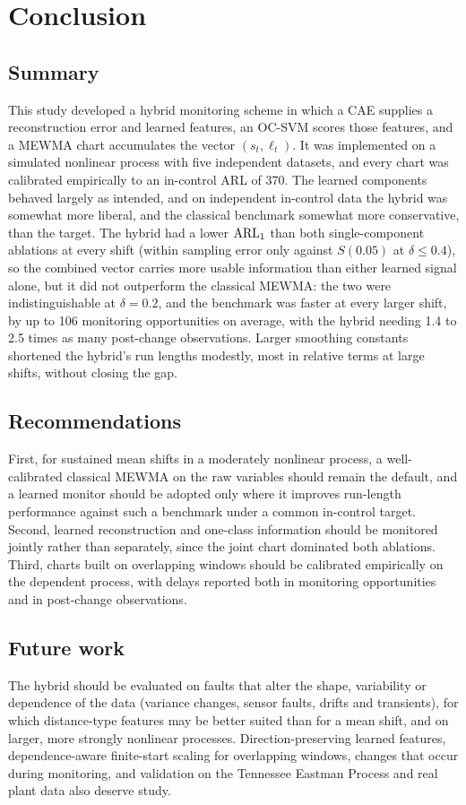 \section{Conclusion}

\subsection{Summary}

This study developed a hybrid monitoring scheme in which a CAE supplies a reconstruction error and
learned features, an OC-SVM scores those features, and a MEWMA chart accumulates the vector
$(s_t,\ell_t)$. It was implemented on a simulated nonlinear process with five independent datasets,
and every chart was calibrated empirically to an in-control ARL of 370. The learned components
behaved largely as intended, and on independent in-control data the hybrid was somewhat more liberal,
and the classical benchmark somewhat more conservative, than the target. The hybrid had a lower
$\mathrm{ARL}_1$ than both single-component ablations at every shift (within sampling error only against
$S(0.05)$ at $\delta\le0.4$), so the combined vector carries more usable information than either
learned signal alone, but it did not outperform the classical MEWMA: the two were
indistinguishable at $\delta=0.2$, and the benchmark was faster at every larger shift, by up to 106
monitoring opportunities on average, with the hybrid needing 1.4 to 2.5 times as many post-change
observations. Larger smoothing constants shortened the hybrid's run lengths modestly, most in
relative terms at large shifts, without closing the gap.

\subsection{Recommendations}

First, for sustained mean shifts in a moderately nonlinear process, a well-calibrated classical MEWMA
on the raw variables should remain the default, and a learned monitor should be adopted only where it
improves run-length performance against such a benchmark under a common in-control target. Second,
learned reconstruction and one-class information should be monitored jointly rather than separately,
since the joint chart dominated both ablations. Third, charts built on overlapping windows should be
calibrated empirically on the dependent process, with delays reported both in monitoring
opportunities and in post-change observations.

\subsection{Future work}

The hybrid should be evaluated on faults that alter the shape, variability or dependence of the data
(variance changes, sensor faults, drifts and transients), for which distance-type features may be
better suited than for a mean shift, and on larger, more strongly nonlinear processes.
Direction-preserving learned features, dependence-aware finite-start scaling for overlapping windows,
changes that occur during monitoring, and validation on the Tennessee Eastman Process and real plant
data also deserve study.
